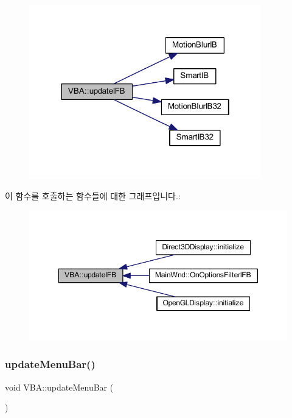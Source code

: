 \nopagebreak
\begin{figure}[H]
\begin{center}
\leavevmode
\includegraphics[width=286pt]{class_v_b_a_ab1caa25635cd40fc3b49b5d325cc65ef_cgraph}
\end{center}
\end{figure}
이 함수를 호출하는 함수들에 대한 그래프입니다.\+:
\nopagebreak
\begin{figure}[H]
\begin{center}
\leavevmode
\includegraphics[width=350pt]{class_v_b_a_ab1caa25635cd40fc3b49b5d325cc65ef_icgraph}
\end{center}
\end{figure}
\mbox{\label{class_v_b_a_accf3451bad473b90400193636cd27c96}} 
\subsubsection{\texorpdfstring{update\+Menu\+Bar()}{updateMenuBar()}}
{\footnotesize\ttfamily void V\+B\+A\+::update\+Menu\+Bar (\begin{DoxyParamCaption}{ }\end{DoxyParamCaption})}



